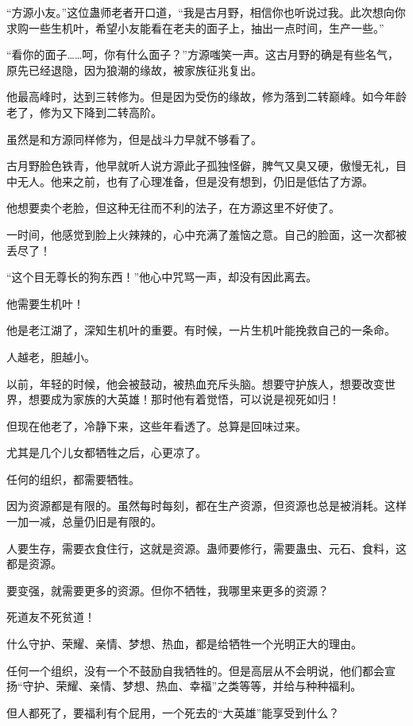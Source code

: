 \begin{this_body}
“方源小友。”这位蛊师老者开口道，“我是古月野，相信你也听说过我。此次想向你求购一些生机叶，希望小友能看在老夫的面子上，抽出一点时间，生产一些。”

“看你的面子……呵，你有什么面子？”方源嗤笑一声。这古月野的确是有些名气，原先已经退隐，因为狼潮的缘故，被家族征兆复出。

他最高峰时，达到三转修为。但是因为受伤的缘故，修为落到二转巅峰。如今年龄老了，修为又下降到二转高阶。

虽然是和方源同样修为，但是战斗力早就不够看了。

古月野脸色铁青，他早就听人说方源此子孤独怪僻，脾气又臭又硬，傲慢无礼，目中无人。他来之前，也有了心理准备，但是没有想到，仍旧是低估了方源。

他想要卖个老脸，但这种无往而不利的法子，在方源这里不好使了。

一时间，他感觉到脸上火辣辣的，心中充满了羞恼之意。自己的脸面，这一次都被丢尽了！

“这个目无尊长的狗东西！”他心中咒骂一声，却没有因此离去。

他需要生机叶！

他是老江湖了，深知生机叶的重要。有时候，一片生机叶能挽救自己的一条命。

人越老，胆越小。

以前，年轻的时候，他会被鼓动，被热血充斥头脑。想要守护族人，想要改变世界，想要成为家族的大英雄！那时他有着觉悟，可以说是视死如归！

但现在他老了，冷静下来，这些年看透了。总算是回味过来。

尤其是几个儿女都牺牲之后，心更凉了。

任何的组织，都需要牺牲。

因为资源都是有限的。虽然每时每刻，都在生产资源，但资源也总是被消耗。这样一加一减，总量仍旧是有限的。

人要生存，需要衣食住行，这就是资源。蛊师要修行，需要蛊虫、元石、食料，这都是资源。

要变强，就需要更多的资源。但你不牺牲，我哪里来更多的资源？

死道友不死贫道！

什么守护、荣耀、亲情、梦想、热血，都是给牺牲一个光明正大的理由。

任何一个组织，没有一个不鼓励自我牺牲的。但是高层从不会明说，他们都会宣扬“守护、荣耀、亲情、梦想、热血、幸福”之类等等，并给与种种福利。

但人都死了，要福利有个屁用，一个死去的“大英雄”能享受到什么？


\end{this_body}
